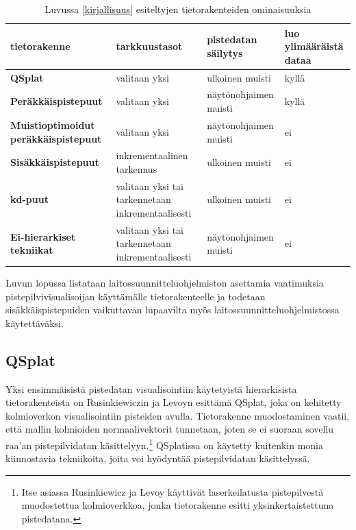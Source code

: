 \begin{table}[h]
\begin{tabular}{|p{4.0cm}|p{4.5cm}|p{3cm}|p{2.6cm}|}
\hline
\textbf{tietorakenne} & \textbf{tarkkuustasot} & \textbf{pistedatan säilytys} & \textbf{luo ylimääräistä dataa} \\ \hline
\textbf{QSplat \cite{qsplat}} & valitaan yksi & ulkoinen muisti & kyllä                           \\ \hline
\textbf{Peräkkäispistepuut \cite{spt}} & valitaan yksi & näytönohjaimen muisti & kyllä \\ \hline
\textbf{Muistioptimoidut peräkkäispistepuut \cite{ip}} & valitaan yksi & näytönohjaimen muisti & ei \\ \hline
\textbf{Sisäkkäispistepuut \cite{scheiblauer}\cite{potree}} & inkrementaalinen tarkennus & ulkoinen muisti & ei \\ \hline
\textbf{kd-puut \cite{richter}\cite{smooth}} & valitaan yksi tai tarkennetaan inkrementaalisesti & ulkoinen muisti & ei \\ \hline
\textbf{Ei-hierarkiset tekniikat \cite{clod}\cite{progressive}} & valitaan yksi tai tarkennetaan inkrementaalisesti & näytönohjaimen muisti        & ei \\ \hline
\end{tabular}
\caption{Luvussa \ref{kirjallisuus} esiteltyjen tietorakenteiden ominaisuuksia}
\label{ominaisuudet}
\end{table}


Luvun lopussa listataan laitossuunnitteluohjelmiston asettamia vaatimuksia pistepilvivisualisoijan käyttämälle tietorakenteelle ja todetaan sisäkkäispistepuiden vaikuttavan lupaavilta myös laitossuunnitteluohjelmistossa käytettäväksi. 

\subsection{QSplat}
Yksi ensimmäisistä pistedatan visualisointiin käytetyistä hierarkisista tietorakenteista on Rusinkiewiczin ja Levoyn esittämä QSplat, joka on kehitetty kolmioverkon visualisointiin pisteiden avulla. Tietorakenne muodostaminen vaatii, että mallin kolmioiden normaalivektorit tunnetaan, joten se ei suoraan sovellu raa'an pistepilvidatan käsittelyyn.\footnote{Itse asiassa Rusinkiewicz ja Levoy käyttivät laserkeilatusta pistepilvestä muodostettua kolmioverkkoa, jonka tietorakenne esitti yksinkertaistettuna pistedatana.} QSplatissa on käytetty kuitenkin monia kiinnostavia tekniikoita, joita voi hyödyntää pistepilvidatan käsittelyssä. \cite{qsplat}

